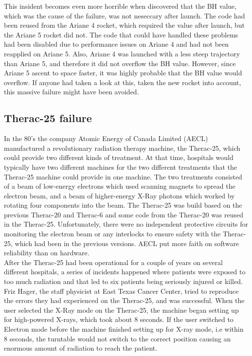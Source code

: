 \documentclass[a4paper]{report}
\begin{document}
This insident becomes even more horrible when discovered that the BH value, which was the cause of the failure, was not neseccary after launch. The code had been reused from the Ariane 4 rocket, which required the value after launch, but the Ariane 5 rocket did not. The code that could have handled these problems had been disabled due to performance issues on Ariane 4 and had not been reapplied on Ariane 5. Also, Ariane 4 was launched with a less steep trajectory than Ariane 5, and therefore it did not overflow the BH value. However, since Ariane 5 ascent to space faster, it was highly probable that the BH value would overflow. If anyone had taken a look at this, taken the new rocket into account, this massive failure might have been avoided.
\subsection{Therac-25 failure}
In the 80's the company Atomic Energy of Canada Limited (AECL) manufactured a revolutionary radiation therapy machine, the Therac-25\cite{Leveson1993}, which could provide two different kinds of treatment. At that time, hospitals would typically have two different machines for the two different treatments that the Therac-25 machine could provide in one machine. The two treatments consisted of a beam of low-energy electrons which used scanning magnets to spread the electron beam, and a beam of higher-energy X-Ray photons which worked by rotating four components into the beam. The Therac-25 was build based on the previous Therac-20 and Therac-6 and some code from the Therac-20 was reused in the Therac-25. Unfortunately, there were no independent protective circuits for monitoring the electron beam or any interlocks to ensure safety with the Therac-25, which had been in the previous versions. AECL put more faith on software reliability than on hardware. \\ After the Therac-25 had been operational for a couple of years on several different hospitals, a series of incidents happened where patients were exposed to too much radiation and that led to six patients being seriously injured or killed. Friz Hager, the staff physicist at East Texas Cancer Center, tried to reproduce the errors they had experienced on the Therac-25, and was successful. When the user selected the X-Ray mode on the Therac-25, the machine began setting up for high-powered X-rays, which took about 8 seconds. If the user switched to Electron mode before the machine finished setting up for X-ray mode, i.e within 8 seconds, the turntable would not switch to the correct position causing an enormous amount of radiation to reach the patient.\\
\end{document}

